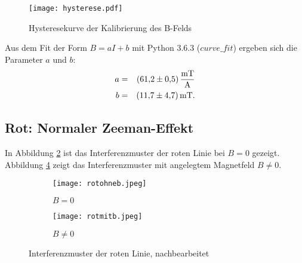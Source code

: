 %
%
\begin{figure}[h!]
  \centering
  \texttt{[image: hysterese.pdf]}
  \caption{Hysteresekurve der Kalibrierung des B-Felds}
  \label{fig:hysterese}
\end{figure}
Aus dem Fit der Form $B=aI+b$ mit Python 3.6.3 ($curve\_fit$) ergeben sich die Parameter $a$ und $b$:
\begin{align*}
   a &=& \SI{61.2 \pm 0.5}{\frac{mT}{A}} \\
   b &=& \SI{11.7 \pm 4.7}{mT}. \\
\end{align*}

\FloatBarrier
\subsection{Rot: Normaler Zeeman-Effekt}
In Abbildung \ref{fig:rotohneb} ist das Interferenzmuster der roten Linie bei $B=0$ gezeigt.
Abbildung \ref{fig:rotmitb} zeigt das Interferenzmuster mit angelegtem Magnetfeld $B≠0$.

\begin{figure}[h!]
   \begin{subfigure}{0.49\textwidth}
     \texttt{[image: rotohneb.jpeg]}
     \caption{$B=0$}
     \label{fig:rotohneb}
   \end{subfigure}
   \begin{subfigure}{0.49\textwidth}
     \texttt{[image: rotmitb.jpeg]}
     \caption{$B≠0$}
     \label{fig:rotmitb}
   \end{subfigure}
   \caption{Interferenzmuster der roten Linie, nachbearbeitet}
\end{figure}


